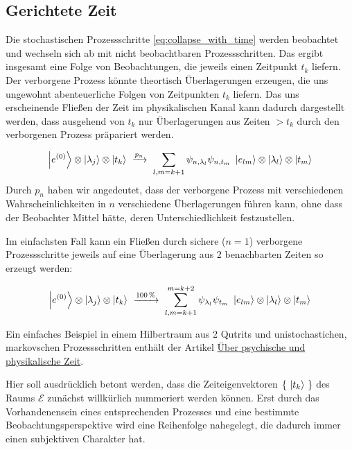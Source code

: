 \documentclass[12pt]{article}
\begin{document}
\subsection{Gerichtete Zeit}

Die stochastischen Prozessschritte \eqref{eq:collapse_with_time} werden beobachtet und wechseln sich ab mit nicht beobachtbaren Prozessschritten. Das ergibt insgesamt eine Folge von Beobachtungen, die jeweils einen Zeitpunkt $t_k$ liefern. Der verborgene Prozess könnte theortisch Überlagerungen erzeugen, die uns ungewohnt abenteuerliche Folgen von Zeitpunkten $t_k$ liefern. Das uns erscheinende Fließen der Zeit im physikalischen Kanal kann dadurch dargestellt werden, dass ausgehend von $t_k$ nur Überlagerungen aus Zeiten $> t_k$ durch den verborgenen Prozess präpariert werden.

\begin{equation} 
\label{eq:preparation_with_time}
\ket{e^{(0)}} \otimes \ket{\lambda_j} \otimes \ket{t_k}
\ \xrightarrow{p_{n}}\ 
\sum_{l,m=k+1} \psi_{n,\lambda_l}\psi_{n,t_m} \ \ket{e_{lm}} \otimes \ket{\lambda_l} \otimes \ket{t_m} 
\end{equation}
Durch $p_n$ haben wir angedeutet, dass der verborgene Prozess mit verschiedenen  Wahrscheinlichkeiten in $n$ verschiedene Überlagerungen führen kann, ohne dass der Beobachter Mittel hätte, deren Unterschiedlichkeit festzustellen.

Im einfachsten Fall kann ein Fließen durch sichere ($n=1$) verborgene Prozessschritte jeweils auf eine Überlagerung aus 2 benachbarten Zeiten so erzeugt werden:

\begin{equation*} 
\ket{e^{(0)}} \otimes \ket{\lambda_j} \otimes \ket{t_k}
\ \xrightarrow{100\,\%}\ 
\sum_{l,m=k+1}^{m=k+2} \psi_{\lambda_l}\psi_{t_m} \ \ket{e_{lm}} \otimes \ket{\lambda_l} \otimes \ket{t_m} 
\end{equation*}

Ein einfaches Beispiel in einem Hilbertraum aus 2 Qutrits und unistochastichen, markovschen Prozessschritten enthält der Artikel \href{http://vermaschung.de/index.php?title=Warum_Panpsychismus%3F}{Über psychische und physikalische Zeit}. 

Hier soll ausdrücklich betont werden, dass die Zeiteigenvektoren $\{\ \ket{t_k}\ \}$ des Raums $\mathscr{E}$ zunächst willkürlich nummeriert werden können. Erst durch das Vorhandenensein eines entsprechenden Prozesses und eine bestimmte Beobachtungsperspektive wird eine Reihenfolge nahegelegt, die dadurch immer einen subjektiven Charakter hat.
\end{document}

